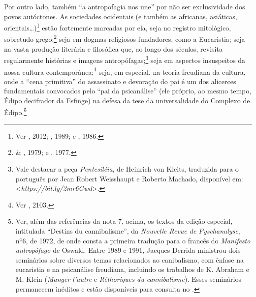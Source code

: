 Por outro lado, também ``a antropofagia nos une'' por não ser
exclusividade dos povos autóctones. As sociedades ocidentais (e também
as africanas, asiáticas, orientais\ldots{})\footnote{Ver ,
  2012; , 1989; e , 1986.} estão fortemente marcadas por
ela, seja no registro mitológico, sobretudo grego;\footnote{ \&
  , 1979; e , 1977.} seja em dogmas religiosos
fundadores, como a Eucaristia; seja na vasta produção literária e
filosófica que, ao longo dos séculos, revisita regularmente histórias e
imagens antropófagas;\footnote{Vale destacar a peça \emph{Pentesiléia},
  de Heinrich von Kleits, traduzida para o português por Jean Robert
  Weisshaupt e Roberto Machado, disponível em:
  \textless{}\emph{https://bit.ly/2mr6Gwd}\textgreater{}.}
seja em aspectos insuspeitos da nossa cultura contemporânea;\footnote{Ver
  , 2103.} seja, em especial, na teoria freudiana da
cultura, onde a ``cena primitiva'' do assassinato e devoração do pai é
um dos alicerces fundamentais convocados pelo ``pai da psicanálise''
(ele próprio, ao mesmo tempo, Édipo decifrador da Esfinge) na defesa da
tese da universalidade do Complexo de Édipo.\footnote{Ver, além das
  referências da nota 7, acima, os textos da edição especial, intitulada
  ``Destins du cannibalisme'', da \emph{Nouvelle Revue de Pyschanalyse},
  nº6, de 1972, de onde consta a primeira tradução para o francês do
  \emph{Manifesto antropófago} de Oswald. Entre 1989 e 1991, Jacques
  Derrida ministrou dois seminários sobre diversos temas relacionados ao
  canibalismo, com ênfase na eucaristia e na psicanálise freudiana,
  incluindo os trabalhos de K. Abraham e M. Klein (\emph{Manger l'autre}
  e \emph{Réthoriques du cannibalisme}). Esses seminários permanecem
  inéditos e estão disponíveis para consulta no .}

